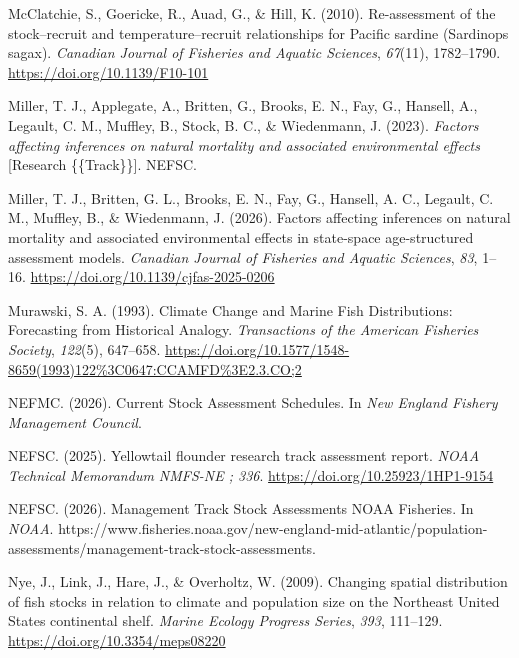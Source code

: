 \documentclass[
  12pt,
]{article}
\newlength{\cslhangindent}
\newenvironment{CSLReferences}[2] %
 {\begin{list}{}{%
  \setlength{\itemindent}{0pt}
  \setlength{\leftmargin}{0pt}
  \setlength{\parsep}{0pt}
  \ifodd #1
   \setlength{\leftmargin}{\cslhangindent}
   \setlength{\itemindent}{-1\cslhangindent}
  \fi
  \setlength{\itemsep}{#2\baselineskip}}}
 {\end{list}}
\begin{document}
\begin{CSLReferences}{1}{2}
McClatchie, S., Goericke, R., Auad, G., \& Hill, K. (2010). Re-assessment of the stock--recruit and temperature--recruit relationships for {Pacific} sardine ({Sardinops} sagax). \emph{Canadian Journal of Fisheries and Aquatic Sciences}, \emph{67}(11), 1782--1790. \url{https://doi.org/10.1139/F10-101}

Miller, T. J., Applegate, A., Britten, G., Brooks, E. N., Fay, G., Hansell, A., Legault, C. M., Muffley, B., Stock, B. C., \& Wiedenmann, J. (2023). \emph{Factors affecting inferences on natural mortality and associated environmental effects} {[}Research \{\{Track\}\}{]}. NEFSC.

Miller, T. J., Britten, G. L., Brooks, E. N., Fay, G., Hansell, A. C., Legault, C. M., Muffley, B., \& Wiedenmann, J. (2026). Factors affecting inferences on natural mortality and associated environmental effects in state-space age-structured assessment models. \emph{Canadian Journal of Fisheries and Aquatic Sciences}, \emph{83}, 1--16. \url{https://doi.org/10.1139/cjfas-2025-0206}

Murawski, S. A. (1993). Climate Change and Marine Fish Distributions: Forecasting from Historical Analogy. \emph{Transactions of the American Fisheries Society}, \emph{122}(5), 647--658. \url{https://doi.org/10.1577/1548-8659(1993)122\%3C0647:CCAMFD\%3E2.3.CO;2}

NEFMC. (2026). Current {Stock Assessment Schedules}. In \emph{New England Fishery Management Council}.

NEFSC. (2025). Yellowtail flounder research track assessment report. \emph{NOAA Technical Memorandum NMFS-NE ; 336}. \url{https://doi.org/10.25923/1HP1-9154}

NEFSC. (2026). Management {Track Stock Assessments} \textbar{} {NOAA Fisheries}. In \emph{NOAA}. https://www.fisheries.noaa.gov/new-england-mid-atlantic/population-assessments/management-track-stock-assessments.

Nye, J., Link, J., Hare, J., \& Overholtz, W. (2009). Changing spatial distribution of fish stocks in relation to climate and population size on the Northeast United States continental shelf. \emph{Marine Ecology Progress Series}, \emph{393}, 111--129. \url{https://doi.org/10.3354/meps08220}


\end{CSLReferences}
\end{document}

